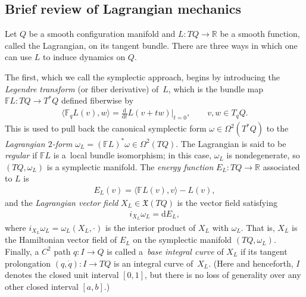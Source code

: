 \documentclass[pdftex]{sigma}
\numberwithin{equation}{section}
\begin{document}
\subsection{Brief review of Lagrangian mechanics}\label{sec:review}

Let $Q$ be a smooth conf\/iguration manifold and $ L \colon T Q \rightarrow \mathbb{R} $ be a smooth function, called the Lagrangian, on its tangent bundle. There are three ways in which one can use $L$ to induce dynamics on $Q$.

The f\/irst, which we call the symplectic approach, begins by introducing the \emph{Legendre transform} (or f\/iber derivative) of~$L$, which is the bundle map $ \mathbb{F} L \colon T Q \rightarrow T ^\ast Q $ def\/ined f\/iberwise by
\begin{gather*}
 \bigl\langle \mathbb{F} _q L (v) , w \bigr\rangle = \frac{\mathrm{d}}{\mathrm{d}t} L ( v + t w ) \Bigr\rvert _{ t = 0 }, \qquad v, w \in T _q Q .
\end{gather*}
This is used to pull back the canonical symplectic form $ \omega \in \Omega ^2 ( T ^\ast Q ) $ to the \emph{Lagrangian $2$-form} $ \omega _L = ( \mathbb{F} L ) ^\ast \omega \in \Omega ^2 ( T Q ) $. The Lagrangian is said to be \emph{regular} if $ \mathbb{F} L $ is a~local bundle isomorphism; in this case, $ \omega _L $ is nondegenerate, so $ ( T Q , \omega _L ) $ is a symplectic manifold. The \emph{energy function} $ E _L \colon T Q \rightarrow \mathbb{R} $ associated to $L$ is
\begin{gather*}
 E _L (v) = \bigl\langle \mathbb{F} L (v) , v \bigr\rangle - L (v) ,
\end{gather*}
and the \emph{Lagrangian vector field} $ X _L \in \mathfrak{X} ( T Q ) $ is the vector f\/ield satisfying
\begin{gather*}
 i _{ X _L } \omega _L = \mathrm{d} E _L ,
\end{gather*}
where $ i _{ X _L } \omega _L = \omega _L ( X _L , \cdot ) $ is the interior product of $ X _L $ with $ \omega _L $. That is, $ X _L $ is the Hamiltonian vector f\/ield of $ E _L $ on the symplectic manifold $ ( T Q, \omega _L ) $. Finally, a $ C ^2 $ path $ q \colon I \rightarrow Q $ is called a~\emph{base integral curve} of $ X _L $ if its tangent prolongation $ ( q, \dot{q} ) \colon I \rightarrow T Q $ is an integral curve of~$ X _L $. (Here and henceforth, $I$ denotes the closed unit interval $ [0,1] $, but there is no loss of generality over any other closed interval $[a,b]$.)
\end{document}
